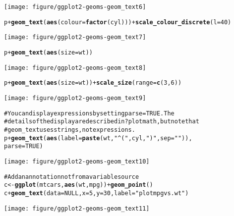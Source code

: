 \documentclass[a4paper,titlepage]{tufte-handout}\usepackage{graphicx, color}
\makeatletter
\def\maxwidth{ %
  \ifdim\Gin@nat@width>\linewidth
    \linewidth
  \else
    \Gin@nat@width
  \fi
}
\newcommand{\hlfunctioncall}[1]{\textcolor[rgb]{0.501960784313725,0,0.329411764705882}{\textbf{#1}}}%
\newcommand{\hlstring}[1]{\textcolor[rgb]{0.6,0.6,1}{#1}}%
\newcommand{\hlcomment}[1]{\textcolor[rgb]{0.180392156862745,0.6,0.341176470588235}{#1}}%
\newenvironment{kframe}{%
 \def\at@end@of@kframe{}%
 \ifinner\ifhmode%
  \def\at@end@of@kframe{\end{minipage}}%
  \begin{minipage}{\columnwidth}%
 \fi\fi%
 \def\FrameCommand##1{\hskip\@totalleftmargin \hskip-\fboxsep
 \colorbox{shadecolor}{##1}\hskip-\fboxsep
     \hskip-\linewidth \hskip-\@totalleftmargin \hskip\columnwidth}%
 \MakeFramed {\advance\hsize-\width
   \@totalleftmargin\z@ \linewidth\hsize
   \@setminipage}}%
 {\par\unskip\endMakeFramed%
 \at@end@of@kframe}
\newenvironment{knitrout}{}{} %
\makeatother
\begin{document}
\begin{knitrout}
\begin{kframe}
\begin{alltt}
\end{alltt}
\end{kframe}\texttt{[image: figure/ggplot2-geoms-geom\_text6]} \begin{kframe}\begin{alltt}
p + \hlfunctioncall{geom_text}(\hlfunctioncall{aes}(colour=\hlfunctioncall{factor}(cyl))) + \hlfunctioncall{scale_colour_discrete}(l=40)
\end{alltt}
\end{kframe}\texttt{[image: figure/ggplot2-geoms-geom\_text7]} \begin{kframe}\begin{alltt}
p + \hlfunctioncall{geom_text}(\hlfunctioncall{aes}(size=wt))
\end{alltt}
\end{kframe}\texttt{[image: figure/ggplot2-geoms-geom\_text8]} \begin{kframe}\begin{alltt}
p + \hlfunctioncall{geom_text}(\hlfunctioncall{aes}(size=wt)) + \hlfunctioncall{scale_size}(range=\hlfunctioncall{c}(3,6))
\end{alltt}
\end{kframe}\texttt{[image: figure/ggplot2-geoms-geom\_text9]} \begin{kframe}\begin{alltt}
\hlcomment{# You can display expressions by setting parse = TRUE.  The}
\hlcomment{# details of the display are described in ?plotmath, but note that}
\hlcomment{# geom_text uses strings, not expressions.}
p + \hlfunctioncall{geom_text}(\hlfunctioncall{aes}(label = \hlfunctioncall{paste}(wt, \hlstring{"^("}, cyl, \hlstring{")"}, sep = \hlstring{""})),
  parse = TRUE)
\end{alltt}
\end{kframe}\texttt{[image: figure/ggplot2-geoms-geom\_text10]} \begin{kframe}\begin{alltt}
\hlcomment{# Add an annotation not from a variable source}
c <- \hlfunctioncall{ggplot}(mtcars, \hlfunctioncall{aes}(wt, mpg)) + \hlfunctioncall{geom_point}()
c + \hlfunctioncall{geom_text}(data = NULL, x = 5, y = 30, label = \hlstring{"plot mpg vs. wt"})
\end{alltt}
\end{kframe}\texttt{[image: figure/ggplot2-geoms-geom\_text11]} \begin{kframe}\begin{alltt}

\end{alltt}
\end{kframe}
\end{knitrout}
\end{document}

